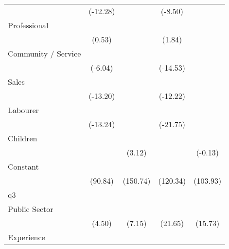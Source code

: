 {\begin{tabular}{l*{4}{c}}
                    &    (-12.28)         &                     &     (-8.50)         &                     \\
[1em]
Professional        &                     &                     &                     &                     \\
                    &      (0.53)         &                     &      (1.84)         &                     \\
[1em]
Community / Service &            \sym{***}&                     &            \sym{***}&                     \\
                    &     (-6.04)         &                     &    (-14.53)         &                     \\
[1em]
Sales               &            \sym{***}&                     &            \sym{***}&                     \\
                    &    (-13.20)         &                     &    (-12.22)         &                     \\
[1em]
Labourer            &            \sym{***}&                     &            \sym{***}&                     \\
                    &    (-13.24)         &                     &    (-21.75)         &                     \\
[1em]
Children            &                     &            \sym{**} &                     &                     \\
                    &                     &      (3.12)         &                     &     (-0.13)         \\
[1em]
Constant            &            \sym{***}&            \sym{***}&            \sym{***}&            \sym{***}\\
                    &     (90.84)         &    (150.74)         &    (120.34)         &    (103.93)         \\
\hline
q3                  &                     &                     &                     &                     \\
Public Sector       &            \sym{***}&            \sym{***}&            \sym{***}&            \sym{***}\\
                    &      (4.50)         &      (7.15)         &     (21.65)         &     (15.73)         \\
[1em]
Experience          &            \sym{***}&            \sym{***}&            \sym{***}&            \sym{***}\\

\end{tabular}}

